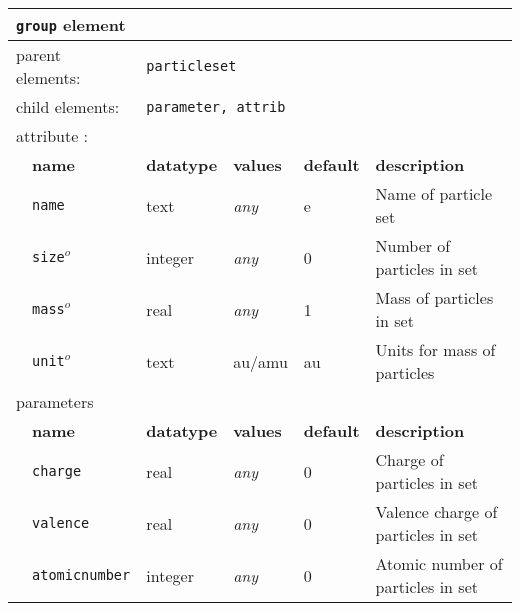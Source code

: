 \begin{table}[h]
\begin{center}
\begin{tabularx}{\textwidth}{l l l l l l }
\hline
\multicolumn{6}{l}{\texttt{group} element} \\
\hline
\multicolumn{2}{l}{parent elements:} & \multicolumn{4}{l}{\texttt{particleset}}\\
\multicolumn{2}{l}{child  elements:} & \multicolumn{4}{l}{\texttt{parameter, attrib}}\\
\multicolumn{2}{l}{attribute      :} & \multicolumn{4}{l}{}\\
   &   \bfseries name            & \bfseries datatype & \bfseries values & \bfseries default   & \bfseries description \\
   &   \texttt{name}               &  text              &  \textit{any}    &  e                & Name of particle set  \\
   &   \texttt{size}$^o$           &  integer           &  \textit{any}    &  0                & Number of particles in set \\
   &   \texttt{mass}$^o$           &  real              &  \textit{any}    &  1                & Mass of particles in set \\
   &   \texttt{unit}$^o$          &  text              &  au/amu          &  au               & Units for mass of particles \\
\multicolumn{2}{l}{parameters}  & \multicolumn{4}{l}{}\\
   &   \bfseries name     & \bfseries datatype & \bfseries values & \bfseries default   & \bfseries description \\
   &   \texttt{charge}    &  real              &  \textit{any}    &  0                  & Charge of particles in set \\
   &   \texttt{valence}   &  real              &  \textit{any}    &  0                  & Valence charge of particles in set \\
   &   \texttt{atomicnumber} &  integer        &  \textit{any}    &  0                  & Atomic number of particles in set \\
  \hline
  \hline
\end{tabularx}
\end{center}
\end{table}

